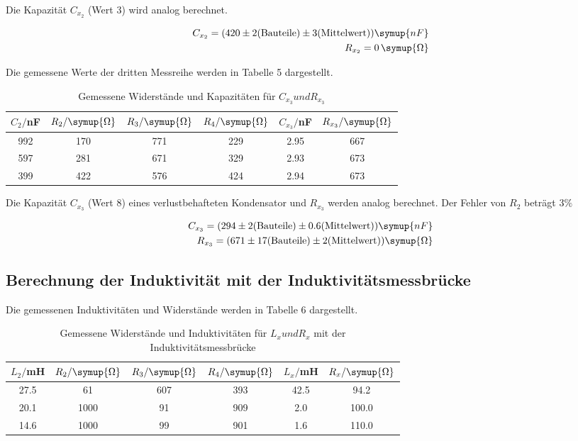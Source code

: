 Die Kapazität $C_{x_2}$ (Wert 3) wird analog berechnet.

\begin{align*}
  C_{x_2} = (420 \pm 2 \text{(Bauteile)} \pm 3 \text{(Mittelwert)})  \symup{nF} \\
  R_{x_2} = 0 \, \symup{\Omega}
\end{align*}


Die gemessene Werte der dritten Messreihe werden in Tabelle 5 dargestellt.

\begin{table}[H]
  \centering
  \caption{Gemessene Widerstände und Kapazitäten für $C_{x_3} und R_{x_3}$}
  \label{tab:Widerstand}
  \begin{tabular}{c c c c c c}
    \toprule
    $C_2/$nF & $R_2/ \symup{\Omega}$ & $R_3/ \symup{\Omega}$ & $R_4 / \symup{\Omega}$ & $C_{x_3}/$nF & $R_{x_3}/ \symup{\Omega}$  \\
    \midrule
    992 & 170 & 771 & 229 &  2.95 & 667  \\
    597 & 281 & 671 & 329 &  2.93 & 673  \\
    399 & 422 & 576 & 424 &  2.94 & 673  \\
    \bottomrule
  \end{tabular}
\end{table}

Die Kapazität $C_{x_3}$ (Wert 8) eines verlustbehafteten Kondensator und $R_{x_3}$ werden analog berechnet.
Der Fehler von $R_2$ beträgt $3\%$

\begin{align*}
  C_{x_3} = (294 \pm 2 \text{(Bauteile)} \pm 0.6 \text{(Mittelwert)})  \symup{nF} \\
  R_{x_3} = (671 \pm 17 \text{(Bauteile)} \pm 2\text{(Mittelwert)}) \symup{\Omega}
\end{align*}



\subsection{Berechnung der Induktivität mit der Induktivitätsmessbrücke}

Die gemessenen Induktivitäten und Widerstände werden in Tabelle 6 dargestellt.

\begin{table}[H]
  \centering
  \caption{Gemessene Widerstände und Induktivitäten für $L_{x} und R_{x}$ mit der Induktivitätsmessbrücke}
  \label{tab:Widerstand}
  \begin{tabular}{c c c c c c}
    \toprule
    $L_2/$mH & $R_2/ \symup{\Omega}$ & $R_3/ \symup{\Omega}$ & $R_4 / \symup{\Omega}$ & $L_x/$mH & $R_x / \symup{\Omega}$  \\
    \midrule
    27.5 &   61 & 607 & 393 & 42.5   & 94.2 \\
    20.1 & 1000 &  91 & 909 &  2.0   & 100.0\\
    14.6 & 1000 &  99 & 901 &  1.6   & 110.0\\
    \bottomrule
  \end{tabular}
\end{table}


